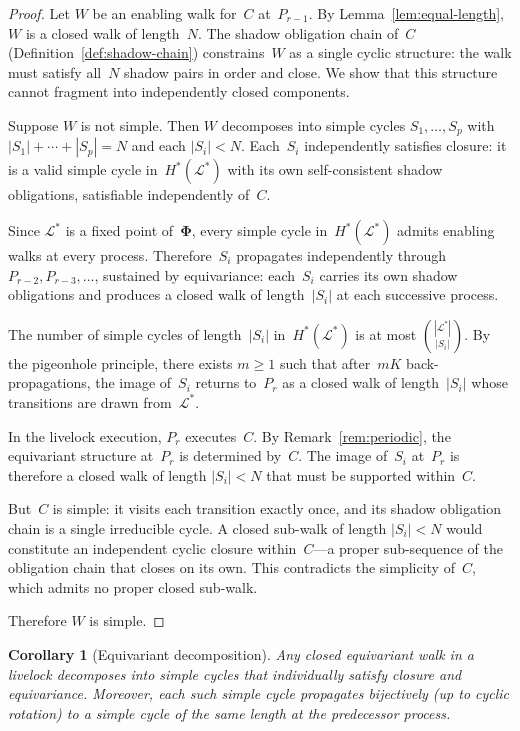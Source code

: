 \documentclass{article}
\newtheorem{corollary}[theorem]{Corollary}
\newcommand{\Ls}{\mathcal{L}^{*}}
\newcommand{\bPhi}{\boldsymbol{\Phi}}
\newcommand{\Hstar}{H^{*}}
\begin{document}
\begin{proof}
Let $W$ be an enabling walk for~$C$ at~$P_{r-1}$.
By Lemma~\ref{lem:equal-length}, $W$ is a closed walk
of length~$N$.
The shadow obligation chain of~$C$
(Definition~\ref{def:shadow-chain}) constrains~$W$ as
a single cyclic structure: the walk must satisfy all~$N$
shadow pairs in order and close.
We show that this structure cannot fragment into
independently closed components.

Suppose $W$ is not simple.
Then $W$ decomposes into simple cycles $S_1, \ldots, S_p$
with $|S_1| + \cdots + |S_p| = N$ and each $|S_i| < N$.
Each~$S_i$ independently satisfies closure: it is a valid
simple cycle in~$\Hstar(\Ls)$ with its own self-consistent
shadow obligations, satisfiable independently of~$C$.

Since $\Ls$ is a fixed point of~$\bPhi$, every simple
cycle in~$\Hstar(\Ls)$ admits enabling walks at every
process.
Therefore~$S_i$ propagates independently through
$P_{r-2}, P_{r-3}, \ldots$, sustained by equivariance:
each~$S_i$ carries its own shadow obligations and
produces a closed walk of length~$|S_i|$ at each
successive process.

The number of simple cycles of length~$|S_i|$
in~$\Hstar(\Ls)$ is at most $\binom{|\Ls|}{|S_i|}$.
By the pigeonhole principle, there exists $m \geq 1$ such
that after~$mK$ back-propagations, the image of~$S_i$
returns to~$P_r$ as a closed walk of length~$|S_i|$
whose transitions are drawn from~$\Ls$.

In the livelock execution, $P_r$ executes~$C$.
By Remark~\ref{rem:periodic}, the equivariant structure
at~$P_r$ is determined by~$C$.
The image of~$S_i$ at~$P_r$ is therefore a closed walk
of length $|S_i| < N$ that must be supported within~$C$.

But~$C$ is simple: it visits each transition exactly once,
and its shadow obligation chain is a single irreducible
cycle.
A closed sub-walk of length $|S_i| < N$ would constitute
an independent cyclic closure within~$C$---a proper
sub-sequence of the obligation chain that closes on its
own.
This contradicts the simplicity of~$C$, which admits no
proper closed sub-walk.

Therefore $W$ is simple.
\end{proof}

\begin{corollary}[Equivariant decomposition]
\label{cor:decomposition}
Any closed equivariant walk in a livelock decomposes into
simple cycles that individually satisfy closure and equivariance.
Moreover, each such simple cycle propagates bijectively
(up to cyclic rotation) to a simple cycle of the same length
at the predecessor process.
\end{corollary}
\end{document}
